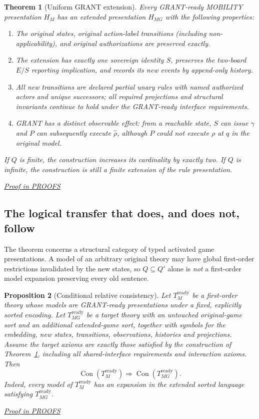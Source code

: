 \documentclass[11pt,letterpaper]{article}
\newtheorem{theorem}{Theorem}[section]
\newtheorem{proposition}[theorem]{Proposition}
\theoremstyle{definition}\newtheorem{definition}[theorem]{Definition}\newtheorem{example}[theorem]{Example}
\theoremstyle{remark}\newtheorem{remark}[theorem]{Remark}
\newcommand{\Con}{\operatorname{Con}}
\newcommand{\prooflink}[1]{\par\noindent\hfill\small\hyperref[#1]{\textit{Proof in PROOFS}}\normalsize}
\begin{document}
\begin{theorem}[Uniform GRANT extension]\label{mobgrant:thm:main}
Every GRANT-ready MOBILITY presentation $H_M$ has an extended presentation $H_{MG}$ with the following properties:
\begin{enumerate}
\item The original states, original action-label transitions (including non-applicability), and original authorizations are preserved exactly.
\item The extension has exactly one sovereign identity $S$, preserves the two-board $E/S$ reporting implication, and records its new events by append-only history.
\item All new transitions are declared partial unary rules with named authorized actors and unique successors; all required projections and structural invariants continue to hold under the GRANT-ready interface requirements.
\item GRANT has a distinct observable effect: from a reachable state, $S$ can issue $\gamma$ and $P$ can subsequently execute $\widehat\rho$, although $P$ could not execute $\rho$ at $q$ in the original model.
\end{enumerate}
If $Q$ is finite, the construction increases its cardinality by exactly two. If $Q$ is infinite, the construction is still a finite extension of the rule presentation.
\end{theorem}
\label{br:mobgrant:stmt:1}\prooflink{br:mobgrant:proof:1}


\subsection{The logical transfer that does, and does not, follow}
The theorem concerns a structural category of typed activated game presentations. A model of an arbitrary original theory may have global first-order restrictions invalidated by the new states, so $Q\subseteq Q'$ alone is \emph{not} a first-order model expansion preserving every old sentence.

\begin{proposition}[Conditional relative consistency]\label{mobgrant:prop:relative}
Let $T_M^{\mathrm{ready}}$ be a first-order theory whose models are GRANT-ready presentations under a fixed, explicitly sorted encoding. Let $T_{MG}^{\mathrm{ready}}$ be a target theory with an untouched original-game sort and an additional extended-game sort, together with symbols for the embedding, new states, transitions, observations, histories and projections. Assume the target axioms are exactly those satisfied by the construction of Theorem~\ref{mobgrant:thm:main}, including all shared-interface requirements and interaction axioms. Then
\[
\Con(T_M^{\mathrm{ready}})\Longrightarrow\Con(T_{MG}^{\mathrm{ready}}).
\]
Indeed, every model of $T_M^{\mathrm{ready}}$ has an expansion in the extended sorted language satisfying $T_{MG}^{\mathrm{ready}}$.
\end{proposition}
\label{br:mobgrant:stmt:2}\prooflink{br:mobgrant:proof:2}
\end{document}
